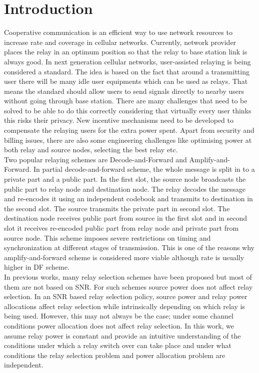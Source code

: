 \documentclass[conference]{IEEEtran}
\begin{document}
\section{Introduction}
Cooperative communication is an efficient way to use network 
resources to increase rate and coverage in cellular networks.
Currently, network provider places the relay in an optimum
position so that the relay to base station link is always good. 
In next generation cellular networks, user-assisted relaying is being 
considered a standard. The idea is based on the fact that around
a transmitting user there will be many idle user equipments which can 
 be used as relays. That means the standard should allow users to 
send signals directly to nearby users without going through base station.
There are many challenges that need to be solved to be able to do
this correctly considering that virtually every user thinks this 
risks their privacy. New incentive mechanisms need to be developed 
to compensate the relaying users for the extra power spent. Apart from
security and billing issues, there are also some engineering challenges
like optimising power at both relay and source nodes, selecting the best relay 
etc. \\ 
Two popular relaying schemes are Decode-and-Forward and Amplify-and-Forward.
In partial decode-and-forward scheme, the whole message is split in to a private
part and a public part. In the first slot, the source node broadcasts the public
part to relay node and destination node. The relay decodes the message and re-encodes
it using an independent codebook and transmits to destination in the second slot.
The source transmits the private part in second slot. The destination node 
receives public part from source in the first slot and in second slot it
receives re-encoded public part from relay node and private part from source node.
This scheme imposes severe restrictions on timing and synchronization at 
different stages of transmission. This is one of the reasons why amplify-and-forward
scheme is considered more viable although rate is usually higher in DF scheme. \\
In previous works, many relay selection schemes have been proposed but most 
of them are not based on SNR. For such schemes source power does not affect 
relay selection. In an SNR based relay selection policy, source
power and relay power allocations affect relay selection while intrinsically
depending on which relay is being used. 
 However, this may not always be the case; 
under some channel conditions power allocation does not affect relay selection.
In this work, we assume relay power is constant and provide an intuitive
understanding of the conditions
under which a relay switch over can take place and under what conditions
the relay selection problem and power allocation problem are independent.
\end{document}
